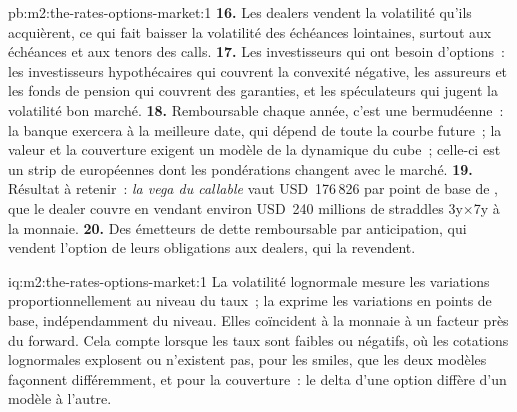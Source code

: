 \begin{solution}{pb:m2:the-rates-options-market:1}
\textbf{16.} Les dealers vendent la volatilité qu'ils acquièrent, ce qui fait baisser la
volatilité des échéances lointaines, surtout aux échéances et aux tenors des calls.
\textbf{17.} Les investisseurs qui ont besoin d'options~: les investisseurs hypothécaires qui couvrent la
convexité négative, les assureurs et les fonds de pension qui couvrent des garanties, et les
spéculateurs qui jugent la volatilité bon marché.
\textbf{18.} Remboursable chaque année, c'est une  bermudéenne~: la banque
exercera à la meilleure date, qui dépend de toute la courbe future~; la valeur et la
couverture exigent un modèle de la dynamique du cube~; celle-ci est un strip de
 européennes dont les pondérations changent avec le marché.
\textbf{19.} Résultat à retenir~: \emph{la vega du callable} vaut USD~176\,826 par point de
base de , que le dealer couvre en vendant environ USD~240
millions de straddles 3y$\times$7y à la monnaie.
\textbf{20.} Des émetteurs de dette remboursable par anticipation, qui vendent l'option de leurs obligations aux
dealers, qui la revendent.
\end{solution}

\begin{solution}{iq:m2:the-rates-options-market:1}
La volatilité lognormale mesure les variations proportionnellement au niveau du taux~; la 
exprime les variations en points de base, indépendamment du niveau. Elles coïncident à la monnaie
à un facteur près du forward. Cela compte lorsque les taux sont faibles ou négatifs,
où les cotations lognormales explosent ou n'existent pas, pour les smiles, que les deux
modèles façonnent différemment, et pour la couverture~: le delta d'une option diffère
d'un modèle à l'autre.
\end{solution}

